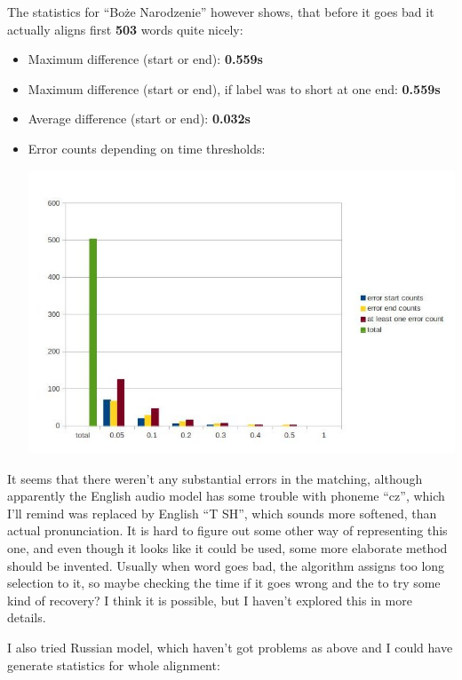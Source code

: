 \documentclass[12pt,a4paper,english]{article}
\begin{document}
The statistics for “Boże Narodzenie” however shows, that before it goes bad it actually aligns first \textbf{503} words quite nicely:
\begin{itemize}
    \item Maximum difference (start or end): 			\textbf{0.559s}
    \item Maximum difference (start or end), if label was to short at one end: 			\textbf{0.559s}
    \item Average difference  (start or end):			\textbf{0.032s}
    \item Error counts depending on time thresholds:
    \begin{center}
        \includegraphics[scale=0.6]{boze_narodzenie_word_english_results.jpg}
    \end{center}
\end{itemize}

It seems that there weren't any substantial errors in the matching, although apparently the English audio model has some trouble with phoneme “cz”, which I'll remind was replaced by English “T SH”, which sounds more softened, than actual pronunciation. It is hard to figure out some other way of representing this one, and even though it looks like it could be used, some more elaborate method should be invented. Usually when word goes bad, the algorithm assigns too long selection to it, so maybe checking the time if it goes wrong and the to try some kind of recovery? I think it is possible, but I haven't explored this in more details. \newline

\newpage

I also tried Russian model, which haven't got problems as above and I could have generate statistics for whole alignment: \newline
\end{document}
